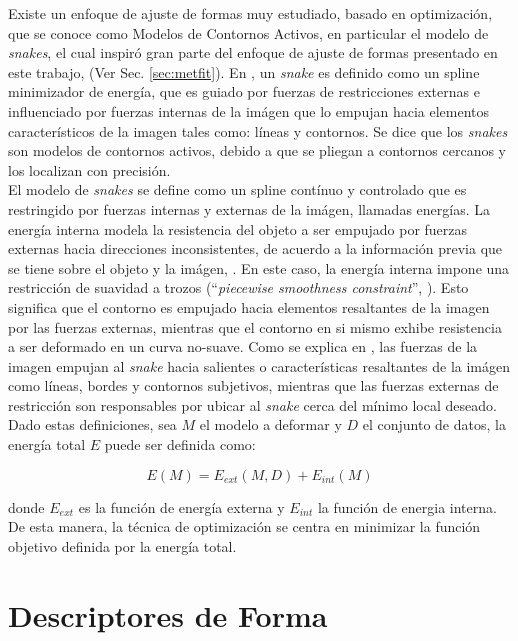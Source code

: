 Existe un enfoque de ajuste de formas muy estudiado, basado en optimizaci\'on,
que se conoce como Modelos de Contornos Activos, en particular el modelo de \emph{snakes}, 
el cual inspir\'o gran parte del enfoque de ajuste de formas presentado en este trabajo, (Ver
Sec. \ref{sec:metfit}). En \cite{snakes}, un \emph{snake} es definido como
un spline minimizador de energ\'ia, que es guiado por fuerzas de restricciones
externas e influenciado por fuerzas internas de la im\'agen que lo empujan
hacia elementos caracter\'isticos de la imagen tales como: l\'ineas y contornos.
Se dice que los \emph{snakes} son modelos de contornos activos, debido a que
se pliegan a contornos cercanos y los localizan con precisi\'on.\\
El modelo de \emph{snakes} se define como un spline cont\'inuo y controlado que 
es restringido por fuerzas internas y externas de la im\'agen, llamadas energ\'ias.
La energ\'ia interna modela la resistencia del objeto a ser empujado por fuerzas externas
hacia direcciones inconsistentes, de acuerdo a la informaci\'on previa que se tiene sobre 
el objeto y la im\'agen, \cite{deformable}. En este caso, la energ\'ia interna impone una
restricci\'on de suavidad a trozos (``\emph{piecewise smoothness constraint}'', \cite{snakes}).
Esto significa que el contorno es empujado hacia elementos resaltantes de la imagen por las
fuerzas externas, mientras que el contorno en si mismo exhibe resistencia a ser deformado
en un curva no-suave. Como se explica en \cite{deformable}, las fuerzas de la imagen
empujan al \emph{snake} hacia salientes o caracter\'isticas resaltantes de la im\'agen como l\'ineas,
bordes y contornos subjetivos, mientras que las fuerzas externas de restricci\'on son responsables
por ubicar al \emph{snake} cerca del m\'inimo local deseado.\\

Dado estas definiciones, sea $M$ el modelo a deformar y $D$ el conjunto de datos, 
la energ\'ia total $E$ puede ser definida como:

$$E(M) = E_{ext}(M,D) + E_{int}(M)$$

donde $E_{ext}$ es la funci\'on de energ\'ia externa y $E_{int}$ la funci\'on
de energia interna. De esta manera, la t\'ecnica de optimizaci\'on se centra
en minimizar la funci\'on objetivo definida por la energ\'ia total.

\section{Descriptores de Forma}
\label{sec:shapedesc}

